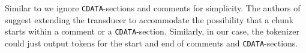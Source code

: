 Similar to \cite{Ogden2013} we ignore \texttt{CDATA}-sections and comments for
simplicity. The authors of \cite{Ogden2013} suggest extending the transducer to
accommodate the possibility that a chunk starts within a comment or a
\texttt{CDATA}-section. Similarly, in our case, the tokenizer could just output
tokens for the start and end of comments and \texttt{CDATA}-sections.



